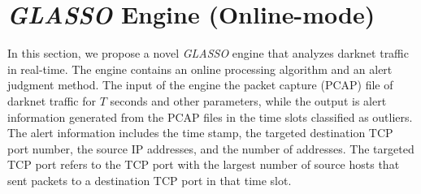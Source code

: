 \documentclass[conference]{IEEEtran}
\begin{document}



\section{{\it GLASSO} Engine (Online-mode)}
In this section, we propose a novel {\it GLASSO} engine that analyzes darknet traffic in real-time.
The engine contains an online processing algorithm and an alert judgment method.
The input of the engine  the packet capture (PCAP) file of darknet traffic for $T$ seconds and other parameters, while the output is alert information generated from the PCAP files in the time slots classified as outliers.
The alert information includes the time stamp, the targeted destination TCP port number, the source IP addresses, and the number of addresses.
The targeted TCP port refers to the TCP port with the largest number of source hosts that sent packets to a destination TCP port in that time slot.


\end{document}
